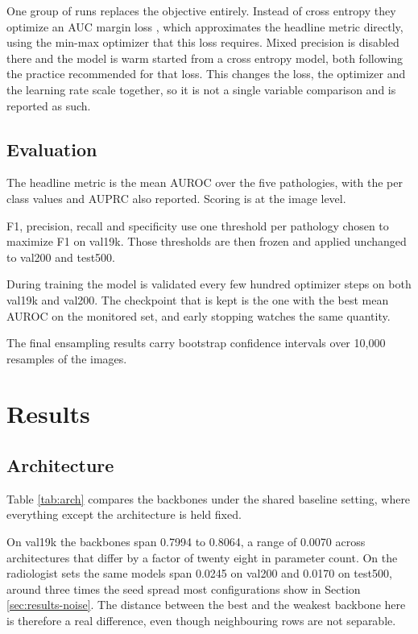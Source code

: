 \documentclass{article}
\begin{document}
One group of runs replaces the objective entirely. Instead of cross entropy they
optimize an AUC margin loss \cite{yuan2021dam}, which approximates the headline metric
directly, using the min-max optimizer that this loss requires. Mixed precision is disabled there and
the model is warm started from a cross entropy model, both following the practice
recommended for that loss. This changes the loss, the optimizer and the learning rate
scale together, so it is not a single variable comparison and is reported as such.

\subsection{Evaluation}

The headline metric is the mean AUROC over the five pathologies, with the per class
values and AUPRC also reported. Scoring is at the image level.

F1, precision, recall and specificity use one threshold per pathology chosen to
maximize F1 on val19k. Those thresholds are then frozen and applied unchanged to
val200 and test500.

During training the model is validated every few hundred optimizer steps on both
val19k and val200. The checkpoint that is kept is the one with the best mean AUROC on
the monitored set, and early stopping watches the same quantity.

The final ensampling results carry bootstrap confidence intervals over 10,000 resamples
of the images.

\section{Results}

\subsection{Architecture}
\label{sec:results-arch}

Table \ref{tab:arch} compares the backbones under the shared baseline setting, where
everything except the architecture is held fixed.

On val19k the backbones span 0.7994 to 0.8064, a range of 0.0070 across architectures
that differ by a factor of twenty eight in parameter count. On the radiologist sets the
same models span 0.0245 on val200 and 0.0170 on test500, around three times the seed
spread most configurations show in Section \ref{sec:results-noise}. The distance between
the best and the weakest backbone here is therefore a real difference, even though
neighbouring rows are not separable.
\end{document}
